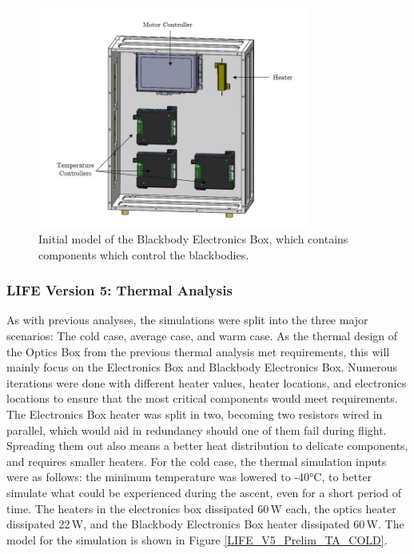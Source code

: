 \begin{figure}
    \centering
    \includegraphics[width=0.8\textwidth]{chap3_images/LIFE_V5_initial_images/BBEbox_V1_init_labelled.JPG}
    \caption{Initial model of the Blackbody Electronics Box, which contains components which control the blackbodies.}
    \label{fig:BBEBOX_PRELIM}
\end{figure}

\subsubsection{LIFE Version 5: Thermal Analysis}
As with previous analyses, the simulations were split into the three major scenarios: The cold case, average case, and warm case. As the thermal design of the Optics Box from the previous thermal analysis met requirements, this will mainly focus on the Electronics Box and Blackbody Electronics Box. Numerous iterations were done with different heater values, heater locations, and electronics locations to ensure that the most critical components would meet requirements. The Electronics Box heater was split in two, becoming two resistors wired in parallel, which would aid in redundancy should one of them fail during flight. Spreading them out also means a better heat distribution to delicate components, and requires smaller heaters. For the cold case, the thermal simulation inputs were as follows: the minimum temperature was lowered to -40°C, to better simulate what could be experienced during the ascent, even for a short period of time. The heaters in the electronics box dissipated 60\,W each, the optics heater dissipated 22\,W, and the Blackbody Electronics Box heater dissipated 60\,W. The model for the simulation is shown in Figure \ref{LIFE_V5_Prelim_TA_COLD}.

